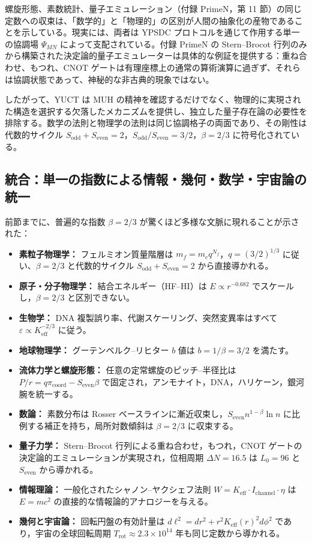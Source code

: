 \documentclass[11pt,a4paper]{article}
\newcommand{\Sodd}{S_{\mathrm{odd}}}
\newcommand{\Seven}{S_{\mathrm{even}}}
\begin{document}
	螺旋形態、素数統計、量子エミュレーション（付録 PrimeN，第 11 節）の同じ定数への収束は、「数学的」と「物理的」の区別が人間の抽象化の産物であることを示している。現実には、両者は YPSDC プロトコルを通じて作用する単一の協調場 \(\Psi_{MN}\) によって支配されている。付録 PrimeN の Stern–Brocot 行列のみから構築された決定論的量子エミュレーターは具体的な例証を提供する：重ね合わせ、もつれ、CNOT ゲートは有理座標上の通常の算術演算に過ぎず、それらは協調状態であって、神秘的な非古典的現象ではない。
	
	したがって、YUCT は MUH の精神を確認するだけでなく、物理的に実現された構造を選択する欠落したメカニズムを提供し、独立した量子存在論の必要性を排除する。数学の法則と物理学の法則は同じ協調格子の両面であり、その剛性は代数的サイクル \(\Sodd + \Seven = 2\)，\(\Sodd/\Seven = 3/2\)，\(\beta = 2/3\) に符号化されている。
	
	\subsection{統合：単一の指数による情報・幾何・数学・宇宙論の統一}
	
	前節までに、普遍的な指数 \(\beta = 2/3\) が驚くほど多様な文脈に現れることが示された：
	
	\begin{itemize}
		\item \textbf{素粒子物理学：} フェルミオン質量階層は \(m_f = m_e q^{N_f}\)，\(q = (3/2)^{1/3}\) に従い、\(\beta = 2/3\) と代数的サイクル \(S_{\mathrm{odd}}+S_{\mathrm{even}}=2\) から直接導かれる。
		\item \textbf{原子・分子物理学：} 結合エネルギー（HF–HI）は \(E \propto r^{-0.682}\) でスケールし，\(\beta = 2/3\) と区別できない。
		\item \textbf{生物学：} DNA 複製誤り率、代謝スケーリング、突然変異率はすべて \(\varepsilon \propto K_{\mathrm{eff}}^{-2/3}\) に従う。
		\item \textbf{地球物理学：} グーテンベルク–リヒター \(b\) 値は \(b = 1/\beta = 3/2\) を満たす。
		\item \textbf{流体力学と螺旋形態：} 任意の定常螺旋のピッチ–半径比は \(P/r = q \pi_{\mathrm{coord}} - S_{\mathrm{even}}\beta\) で固定され，アンモナイト，DNA，ハリケーン，銀河腕を統一する。
		\item \textbf{数論：} 素数分布は Rosser ベースラインに漸近収束し，\(\Seven n^{1-\beta}\ln n\) に比例する補正を持ち，局所対数傾斜は \(\beta = 2/3\) に収束する。
		\item \textbf{量子力学：} Stern–Brocot 行列による重ね合わせ，もつれ，CNOT ゲートの決定論的エミュレーションが実現され，位相周期 \(\Delta N = 16.5\) は \(L_0=96\) と \(\Seven\) から導かれる。
		\item \textbf{情報理論：} 一般化されたシャノン–ヤクシェフ法則 \(W = K_{\mathrm{eff}} \cdot I_{\mathrm{channel}} \cdot \eta\) は \(E = mc^2\) の直接的な情報論的アナロジーを与える。
		\item \textbf{幾何と宇宙論：} 回転円盤の有効計量は \(d\ell^2 = dr^2 + r^2 K_{\mathrm{eff}}(r)^2 d\phi^2\) であり，宇宙の全球回転周期 \(T_{\mathrm{rot}} \approx 2.3\times10^{14}\) 年も同じ定数から導かれる。
	\end{itemize}
	
\end{document}
